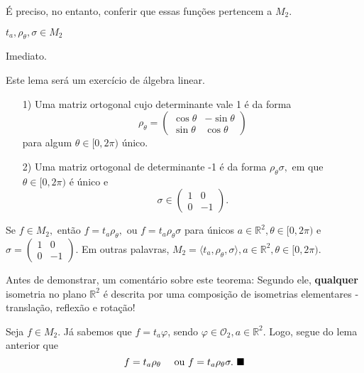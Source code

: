 \documentclass[Algebra/algebra_notes.tex]{subfiles}
\begin{document}
É preciso, no entanto, conferir que essas funções pertencem a $M_{2}.$
\begin{lemma*}
	$t_{a},\rho_{\theta },\sigma \in M_{2}$
\end{lemma*}
\begin{proof*}
	Imediato. \qedsymbol
\end{proof*}
\begin{lemma*}
	Este lema será um exercício de álgebra linear.
	\begin{itemize}
		\item[1)] Uma matriz ortogonal cujo determinante vale 1 é da forma
		      $$
			      \rho_{\theta } = \begin{pmatrix}
				      \cos{\theta } & -\sin{\theta } \\
				      \sin{\theta } & \cos{\theta }
			      \end{pmatrix}
		      $$
		      para algum $\theta \in[0,2\pi )$ único.
		\item[2)] Uma matriz ortogonal de determinante -1 é da forma $\rho_{\theta }\sigma ,$ em que $\theta \in[0, 2\pi)$ é único e
		      $$
			      \sigma \in \begin{pmatrix}
				      1 & 0  \\
				      0 & -1
			      \end{pmatrix}.
		      $$
	\end{itemize}
\end{lemma*}
\begin{theorem*}
	Se $f\in M_{2},$ então $f=t_{a}\rho_{\theta },$ ou $f = t_{a}\rho_{\theta }\sigma  $ para únicos $a\in \mathbb{R}^{2},\theta \in[0,2\pi)$
	e $\sigma = \begin{pmatrix}
			1 & 0  \\
			0 & -1
		\end{pmatrix}$. Em outras palavras, $M_{2} = \langle t_{a}, \rho_{\theta }, \sigma \rangle, a \in \mathbb{R}^{2}, \theta \in[0,2\pi).$
\end{theorem*}
Antes de demonstrar, um comentário sobre este teorema: Segundo ele, \textbf{qualquer} isometria no plano $\mathbb{R}^{2}$ é
descrita por uma composição de isometrias elementares - translação, reflexão e rotação!
\begin{proof*}
	Seja $f\in M_{2}.$ Já sabemos que $f = t_{a}\varphi $, sendo $\varphi \in \mathcal{O}_{2}, a\in \mathbb{R}^{2}.$ Logo, segue do lema
	anterior que
	$$
		f = t_{a}\rho _{\theta }\quad\text{ ou } f = t_{a}\rho_{\theta }\sigma . \text{ $\blacksquare$}
	$$
\end{proof*}
\end{document}
